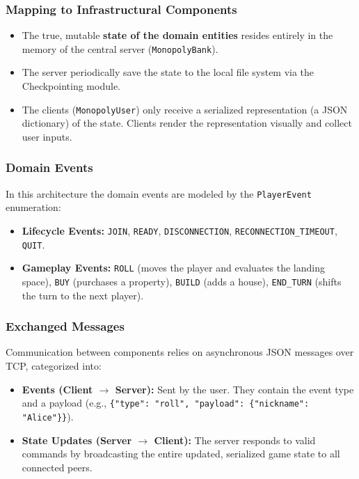 \documentclass{scrartcl}
\begin{document}
\subsubsection*{Mapping to Infrastructural Components}
\begin{itemize}
    \item The true, mutable \textbf{state of the domain entities} resides entirely in the memory of the central server (\texttt{MonopolyBank}).
    \item The server periodically save the state to the local file system via the Checkpointing module.
    \item The clients (\texttt{MonopolyUser}) only receive a serialized representation (a JSON dictionary) of the state. Clients render the representation visually and collect user inputs.
\end{itemize}

\subsubsection*{Domain Events}
In this architecture the domain events are modeled by the \texttt{PlayerEvent} enumeration:
\begin{itemize}
    \item \textbf{Lifecycle Events:} \texttt{JOIN}, \texttt{READY}, \texttt{DISCONNECTION}, \texttt{RECONNECTION\_TIMEOUT}, \texttt{QUIT}.
    \item \textbf{Gameplay Events:} \texttt{ROLL} (moves the player and evaluates the landing space), \texttt{BUY} (purchases a property), \texttt{BUILD} (adds a house), \texttt{END\_TURN} (shifts the turn to the next player).
\end{itemize}

\subsubsection*{Exchanged Messages}
Communication between components relies on asynchronous JSON messages over TCP, categorized into:
\begin{itemize}
    \item \textbf{Events (Client $\rightarrow$ Server):} Sent by the user. They contain the event type and a payload (e.g., \texttt{\{"type": "roll", "payload": \{"nickname": "Alice"\}\}}).
    \item \textbf{State Updates (Server $\rightarrow$ Client):} The server responds to valid commands by broadcasting the entire updated, serialized game state to all connected peers.
\end{itemize}
\end{document}
